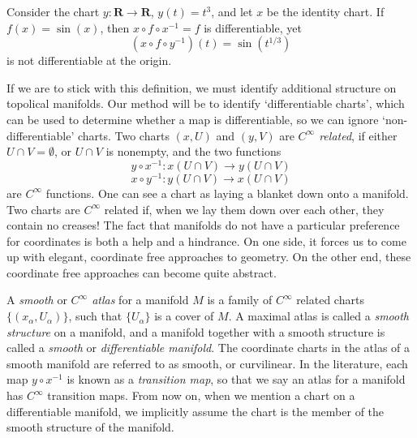 \begin{example}
    Consider the chart $y: \mathbf{R} \to \mathbf{R}$, $y(t) = t^3$, and let $x$ be the identity chart. If $f(x) = \sin(x)$, then $x \circ f \circ x^{-1} = f$ is differentiable, yet
    \[ (x \circ f \circ y^{-1})(t) = \sin( t^{1/3} ) \]
    is not differentiable at the origin.
\end{example}

If we are to stick with this definition, we must identify additional structure on topolical manifolds. Our method will be to identify `differentiable charts', which can be used to determine whether a map is differentiable, so we can ignore `non-differentiable' charts. Two charts $(x,U)$ and $(y,V)$ are \emph{$C^\infty$ related}, if either $U \cap V = \emptyset$, or $U \cap V$ is nonempty, and the two functions
%
\[ y \circ x^{-1} : x(U \cap V) \to y(U \cap V) \]
%
\[ x \circ y^{-1} : y(U \cap V) \to x(U \cap V) \]
%
are $C^\infty$ functions. One can see a chart as laying a blanket down onto a manifold. Two charts are $C^\infty$ related if, when we lay them down over each other, they contain no creases! The fact that manifolds do not have a particular preference for coordinates is both a help and a hindrance. On one side, it forces us to come up with elegant, coordinate free approaches to geometry. On the other end, these coordinate free approaches can become quite abstract.

A \emph{smooth} or \emph{$C^\infty$ atlas} for a manifold $M$ is a family of $C^\infty$ related charts $\{ (x_\alpha, U_\alpha) \}$, such that $\{ U_\alpha \}$ is a cover of $M$. A maximal atlas is called a \emph{smooth structure} on a manifold, and a manifold together with a smooth structure is called a \emph{smooth} or \emph{differentiable manifold}. The coordinate charts in the atlas of a smooth manifold are referred to as smooth, or curvilinear. In the literature, each map $y \circ x^{-1}$ is known as a \emph{transition map}, so that we say an atlas for a manifold has $C^\infty$ transition maps. From now on, when we mention a chart on a differentiable manifold, we implicitly assume the chart is the member of the smooth structure of the manifold.

